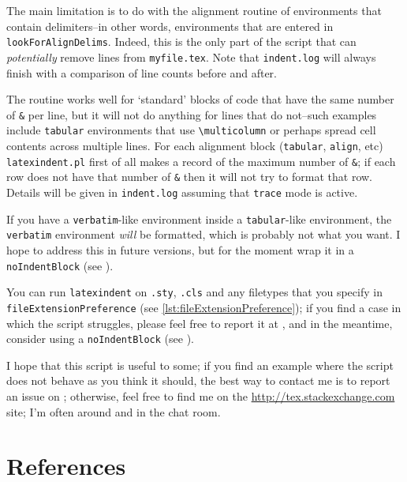 \documentclass[11pt]{article}
\begin{document}
The main limitation is to do with the alignment routine of environments that contain
delimiters--in other words, environments that are entered in \lstinline!lookForAlignDelims!.
Indeed, this is the only part of the script that can \emph{potentially} remove
lines from \lstinline!myfile.tex!. Note that \lstinline!indent.log! will always
finish with a comparison of line counts before and after.

The routine works well for `standard' blocks of code that have the same number of \lstinline!&!
per line, but it will not do anything for lines that do not--such examples
include \lstinline!tabular! environments that use \lstinline!\multicolumn! or
perhaps spread cell contents across multiple lines.  For each alignment block (\lstinline!tabular!,
\lstinline!align!, etc) \lstinline!latexindent.pl! first of all makes a record
of the maximum number of \lstinline!&!; if each row does not have that
number of \lstinline!&! then it will not try to format that row. Details
will be given in \lstinline!indent.log! assuming that \lstinline!trace! mode
is active.

If you have a \lstinline!verbatim!-like environment inside a \lstinline!tabular!-like
environment, the \lstinline!verbatim! environment \emph{will} be formatted, which
is probably not what you want. I hope to address this in future versions, but for the
moment wrap it in a \lstinline!noIndentBlock! (see ).

You can run \lstinline!latexindent! on \lstinline!.sty!, \lstinline!.cls! and any filetypes
that you specify in \lstinline[breaklines=true]!fileExtensionPreference! (see \vref{lst:fileExtensionPreference}); 
if you find a case in which the script struggles, please feel free
to report it at \cite{latexindent-home}, and
in the meantime, consider using a \lstinline!noIndentBlock! (see ).

I hope that this script is useful to some; if you find an example where the
script does not behave as you think it should, the best way to contact me is to
report an issue on \cite{latexindent-home}; otherwise, feel free to find me on 
the \url{http://tex.stackexchange.com} site; I'm often around
and in the chat room.

\nocite{*}
\section{References}
\printbibliography[heading=subbibnumbered,title={External links},notkeyword=contributor]
\printbibliography[env=specialbib,heading=subbibnumbered,title={Contributors\label{sec:contributors}},keyword=contributor]
\end{document}
